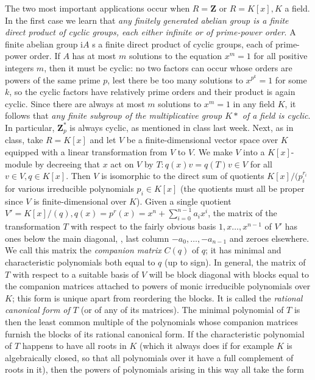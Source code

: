 \documentclass[10pt]{article}
\begin{document}
The two most important applications occur when $R=\mathbf{Z}$ or
$R=K[x], K$ a field. In the first case we learn that {\sl any finitely
  generated abelian group is a finite direct product of cyclic groups,
  each either infinite or of prime-power order}. A finite abelian group
i$A$ s a finite direct product of cyclic groups, each of prime-power
order. If $A$ has at most $m$ solutions to the equation $x^m = 1$ for
all positive integers $m$, then it must be cyclic: no two factors can
occur whose orders are powers of the same prime $p$, lest there be too
many solutions to $x^{p^k}= 1$ for some $k$, so the cyclic factors have
relatively prime orders and their product is again cyclic. Since there
are always at most $m$ solutions to $x^m = 1$ in any field $K$, it
follows that {\sl any finite subgroup of the multiplicative group $K*$
  of a field is cyclic}. In particular, $\mathbf{Z}_p^*$ is always
cyclic, as mentioned in class last week. Next, as in class, take
$R=K[x]$ and let $V$ be a finite-dimensional vector space over $K$
equipped with a linear transformation from $V$ to $V$. We make $V$ into
a $K[x]$-module by decreeing that $x$ act on $V$ by $T: q(x) v = q(T)
v\in V$ for all $v\in V, q\in K[x]$. Then $V$ is isomorphic to the
direct sum of quotients $K[x]/(p_i^{r_i}$ for various irreducible
polynomials $p_i\in K[x]$ (the quotients must all be proper since $V$ is
finite-dimensional over $K$). Given a single quotient $V'=K[x]/(q), q(x)
= p^r(x) = x^n + \sum_{i=0}^{n-1} a_i x^i$, the matrix of the
transformation $T$ with respect to the fairly obvious basis
$1,x\ldots,x^{n-1}$ of $V'$ has ones below the main diagonal, , last
column $-a_0,\ldots,-a_{n-1}$ and zeroes elsewhere. We call this matrix
the {\sl companion matrix} $C(q)$ of $q$; it has minimal and
characteristic polynomials both equal to $q$ (up to sign). In general,
the matrix of $T$ with respect to a suitable basis of $V$ will be block
diagonal with blocks equal to the companion matrices attached to powers
of monic irreducible polynomials over $K$; this form is unique apart
from reordering the blocks. It is called the {\sl rational canonical
  form of $T$} (or of any of its matrices). The minimal polynomial of
$T$ is then the least common multiple of the polynomials whose companion
matrices furnish the blocks of its rational canonical form. If the
characteristic polynomial of $T$ happens to have all roots in $K$ (which
it always does if for example $K$ is algebraically closed, so that all
polynomials over it have a full complement of roots in it), then the
powers of polynomials arising in this way all take the form
\end{document}
